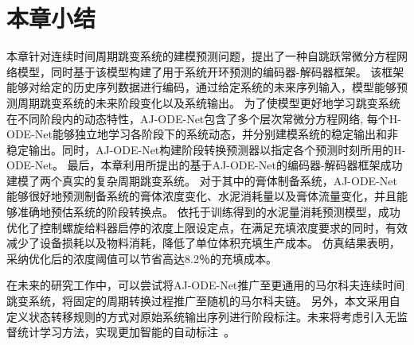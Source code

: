 \section{本章小结}
\label{sec:4_conclusion}
本章针对连续时间周期跳变系统的建模预测问题，提出了一种自跳跃常微分方程网络模型，同时基于该模型构建了用于系统开环预测的编码器-解码器框架。
该框架能够对给定的历史序列数据进行编码，通过给定系统的未来序列输入，模型能够预测周期跳变系统的未来阶段变化以及系统输出。
为了使模型更好地学习跳变系统在不同阶段内的动态特性，AJ-ODE-Net包含了多个层次常微分方程网络, 每个H-ODE-Net能够独立地学习各阶段下的系统动态，并分别建模系统的稳定输出和非稳定输出。同时，AJ-ODE-Net构建阶段转换预测器以指定各个预测时刻所用的H-ODE-Net。
最后，本章利用所提出的基于AJ-ODE-Net的编码器-解码器框架成功建模了两个真实的复杂周期跳变系统。
对于其中的膏体制备系统，AJ-ODE-Net能够很好地预测制备系统的膏体浓度变化、水泥消耗量以及膏体流量变化，并且能够准确地预估系统的阶段转换点。
依托于训练得到的水泥量消耗预测模型，成功优化了控制螺旋给料器启停的浓度上限设定点，在满足充填浓度要求的同时，有效减少了设备损耗以及物料消耗，降低了单位体积充填生产成本。
仿真结果表明，采纳优化后的浓度阈值可以节省高达8.2％的充填成本。


在未来的研究工作中，可以尝试将AJ-ODE-Net推广至更通用的马尔科夫连续时间跳变系统，将固定的周期转换过程推广至随机的马尔科夫链。
另外，本文采用自定义状态转移规则的方式对原始系统输出序列进行阶段标注。未来将考虑引入无监督统计学习方法，实现更加智能的自动标注~\cite{10.1145/3097983.3098060}。






